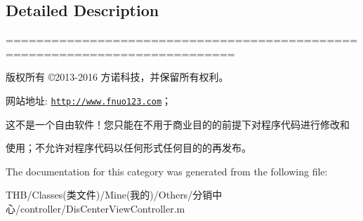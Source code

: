 \subsection{Detailed Description}
============================================================================

版权所有 ©2013-\/2016 方诺科技，并保留所有权利。

网站地址\+: \href{http://www.fnuo123.com}{\tt http\+://www.\+fnuo123.\+com}； 



这不是一个自由软件！您只能在不用于商业目的的前提下对程序代码进行修改和

使用；不允许对程序代码以任何形式任何目的的再发布。 

 

The documentation for this category was generated from the following file\+:\begin{DoxyCompactItemize}
\item 
T\+H\+B/\+Classes(类文件)/\+Mine(我的)/\+Others/分销中心/controller/Dis\+Center\+View\+Controller.\+m\end{DoxyCompactItemize}
